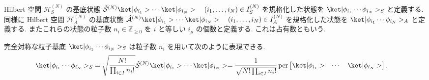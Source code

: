 \documentclass[uplatex,dvipdfmx,a4paper,11pt]{jlreq}
\DeclareMathOperator{\per}{per}
\newcommand{\ZZ}{\mathbb{Z}}
\newcommand{\HH}{\mathcal{H}}
\renewcommand{\S}{\mathcal{S}}
\newcommand{\A}{\mathcal{A}}
\numberwithin{equation}{section}
\theoremstyle{definition}
\begin{document}
\begin{definition}
  Hilbert 空間 $\HH_S^{(N)}$ の基底状態 $\hat{\S}^{(N)}\ket|\phi_{i_1}>\cdots\ket|\phi_{i_N}> \quad (i_1,\ldots,i_N)\in I_S^{(N)}$ を規格化した状態を $\ket|\phi_{i_1}\cdots\phi_{i_N}>_S$ と定義する.
  同様に Hilbert 空間 $\HH_A^{(N)}$ の基底状態 $\hat{\A}^{(N)}\ket|\phi_{i_1}>\cdots\ket|\phi_{i_N}> \quad (i_1,\ldots,i_N)\in I_A^{(N)}$ を規格化した状態を $\ket|\phi_{i_1}\cdots\phi_{i_N}>_A$ と定義する.
  またこれらの状態の粒子数 $n_i\in\ZZ_{\geq 0}$ を $i$ と等しい $i_\mu$ の個数と定義する. これは占有数ともいう.
\end{definition}
\begin{theorem}[Q21-19(i), Q21-20(i)(ii)(iii)]
  完全対称な粒子基底 $\ket|\phi_{i_1}\cdots\phi_{i_N}>_S$ は粒子数 $n_i$ を用いて次のように表現できる.
  \begin{align}
    \ket|\phi_{i_1}\cdots\phi_{i_N}>_S & = \sqrt{\frac{N!}{\prod_{i\in I}n_i!}}\hat{\S}^{(N)}\ket|\phi_{i_1}>\cdots\ket|\phi_{i_N}> = \frac{1}{\sqrt{N!\prod_{i\in I}n_i!}}\per\begin{bmatrix}\ket|\phi_{i_1}> & \cdots & \ket|\phi_{i_N}>\end{bmatrix}.
  \end{align}
\end{theorem}
\end{document}
